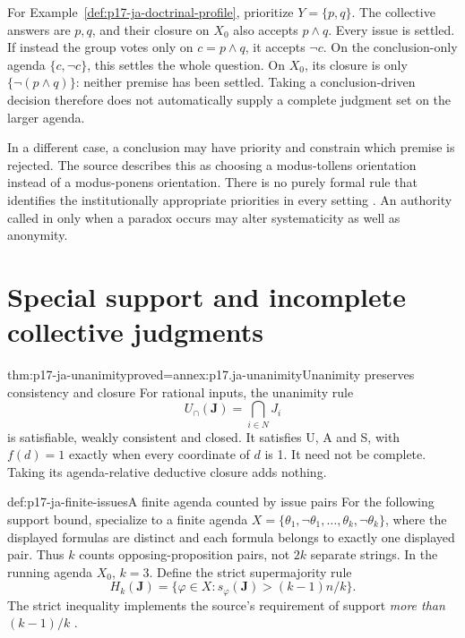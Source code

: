 For Example~\ref{def:p17-ja-doctrinal-profile}, prioritize \(Y=\{p,q\}\).
The collective answers are \(p,q\), and their closure on \(X_0\) also accepts
\(p\land q\). Every issue is settled. If instead the group votes only on
\(c=p\land q\), it accepts \(\neg c\). On the conclusion-only agenda
\(\{c,\neg c\}\), this settles the whole question. On \(X_0\), its closure is
only \(\{\neg(p\land q)\}\): neither premise has been settled. Taking a
conclusion-driven decision therefore does not automatically supply a complete
judgment set on the larger agenda.

In a different case, a conclusion may have priority and constrain which premise
is rejected. The source describes this as choosing a modus-tollens orientation
instead of a modus-ponens orientation. There is no purely formal rule that
identifies the institutionally appropriate priorities in every setting
\cite[pp.~20--23]{ListPettit2001JudgmentPreprint}. An authority called in only
when a paradox occurs may alter systematicity as well as anonymity.

\section{Special support and incomplete collective judgments}
\label{sec:p17-ja-special-support}

\begin{hbtheorem}{thm:p17-ja-unanimity}{proved=annex:p17.ja-unanimity}{Unanimity preserves consistency and closure}
For rational inputs, the unanimity rule
\[
 U_\cap(\mathbf J)=\bigcap_{i\in N}J_i
\]
is satisfiable, weakly consistent and closed. It satisfies U, A and S, with
\(f(d)=1\) exactly when every coordinate of \(d\) is 1. It need not be complete.
Taking its agenda-relative deductive closure adds nothing.
\end{hbtheorem}

\begin{hbdefinition}{def:p17-ja-finite-issues}{A finite agenda counted by issue pairs}
For the following support bound, specialize to a finite agenda
\(X=\{\theta_1,\neg\theta_1,\ldots,\theta_k,\neg\theta_k\}\), where the
displayed formulas are distinct and each formula belongs to exactly one
displayed pair. Thus \(k\) counts opposing-proposition pairs, not \(2k\)
separate strings. In the running agenda \(X_0\), \(k=3\).
Define the strict supermajority rule
\[
 H_k(\mathbf J)=
 \{\varphi\in X:s_\varphi(\mathbf J)>(k-1)n/k\}.
\]
The strict inequality implements the source's requirement of support
\emph{more than} \((k-1)/k\) \cite[pp.~23--24]{ListPettit2001JudgmentPreprint}.
\end{hbdefinition}

